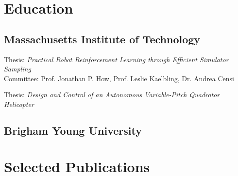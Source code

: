 \documentclass[letterpaper]{deedy-resume} %
\begin{document}
\begin{minipage}[t]{0.62\textwidth} %



\section{Education}

\subsection{Massachusetts Institute of Technology}

Thesis:  \emph{Practical Robot Reinforcement Learning through Efficient
  Simulator Sampling} \\
Committee: Prof. Jonathan P. How, Prof. Leslie Kaelbling, Dr. Andrea Censi

\sectionspace %

Thesis:  \emph{Design and Control of an Autonomous Variable-Pitch Quadrotor Helicopter} \\

\sectionspace %

\subsection{Brigham Young University}


\sectionspace %



\section{Selected Publications}


\end{minipage}
\end{document}
